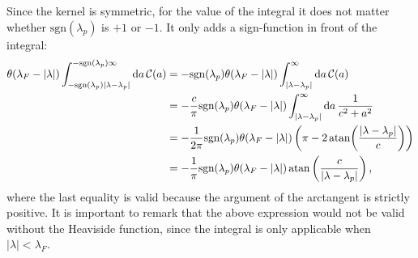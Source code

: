 \documentclass[11pt, a4paper,draft]{report} %
\newcommand{\kernel}{\mathcal{C}}
\begin{document}
Since the kernel is symmetric, for the value of the integral it does not matter whether \(\mathrm{sgn}(\lambda_p)\) is \(+1\) or \(-1\).
It only adds a sign-function in front of the integral:
\begin{align}
	\theta(\lambda_F - \lvert \lambda \rvert) \int_{-\textrm{sgn}(\lambda_p)\lvert\lambda-\lambda_p\rvert}^{ - \textrm{sgn}(\lambda_p)\infty} \dd a\,\kernel(a) &= - \textrm{sgn}(\lambda_p) \theta(\lambda_F - \lvert \lambda \rvert) \int_{\lvert\lambda-\lambda_p\rvert}^{\infty} \dd a\,\kernel(a)\\
	&= - \frac{c}{\pi} \textrm{sgn}(\lambda_p) \theta(\lambda_F - \lvert \lambda \rvert)  \int_{\lvert\lambda-\lambda_p\rvert}^{\infty} \dd a\,\frac{1}{c^2 + a^2}\\
	&= - \frac{1}{2\pi} \textrm{sgn}(\lambda_p) \theta(\lambda_F - \lvert \lambda \rvert)  \left( \pi - 2\atan(\frac{\lvert \lambda - \lambda_p\rvert}{c})\right)\label{eq:dpdeltanonsimplified}\\
	&= - \frac{1}{\pi} \textrm{sgn}(\lambda_p) \theta(\lambda_F - \lvert \lambda \rvert)  \atan\left(\frac{c}{\lvert\lambda-\lambda_p\rvert}\right),
\end{align}
where the last equality is valid because the argument of the arctangent is strictly positive.
It is important to remark that the above expression would not be valid without the Heaviside function, since the integral is only applicable when \(\lvert\lambda\rvert< \lambda_F\).
\end{document}
